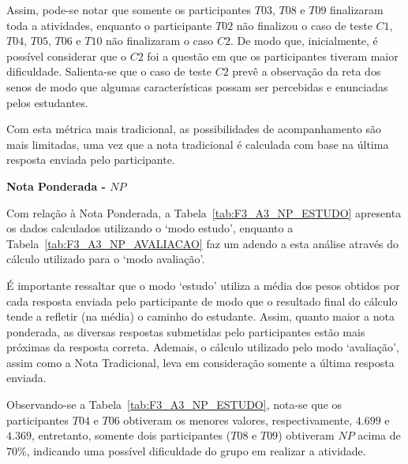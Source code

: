 Assim, pode-se notar que somente os participantes $T03$, $T08$ e $T09$ finalizaram toda a atividades, enquanto o participante $T02$ não finalizou o caso de teste $C1$, $T04$, $T05$, $T06$ e $T10$ não finalizaram o caso $C2$. De modo que, inicialmente, é possível considerar que o $C2$ foi a questão em que os participantes tiveram maior dificuldade. Salienta-se que o caso de teste $C2$ prevê a observação da reta dos senos de modo que algumas características possam ser percebidas e enunciadas pelos estudantes. 

Com esta métrica mais tradicional, as possibilidades de acompanhamento são mais limitadas, uma vez que a nota tradicional é calculada com base na última resposta enviada pelo participante.

\textbf{Nota Ponderada - $NP$}

Com relação à Nota Ponderada, a Tabela~\ref{tab:F3_A3_NP_ESTUDO} apresenta os dados calculados utilizando o `modo estudo', enquanto a Tabela~\ref{tab:F3_A3_NP_AVALIACAO} faz um adendo a esta análise através do cálculo utilizado para o `modo avaliação'. 

É importante ressaltar que o modo `estudo' utiliza a média dos pesos obtidos por cada resposta enviada pelo participante de modo que o resultado final do cálculo tende a refletir (na média) o caminho do estudante. Assim, quanto maior a nota ponderada, as diversas respostas submetidas pelo participantes estão mais próximas da resposta correta. Ademais, o cálculo utilizado pelo modo `avaliação', assim como a Nota Tradicional, leva em consideração somente a última resposta enviada.

Observando-se a Tabela~\ref{tab:F3_A3_NP_ESTUDO}, nota-se que os participantes $T04$ e $T06$ obtiveram os menores valores, respectivamente, $4.699$ e $4.369$, entretanto, somente dois participantes ($T08$ e $T09$) obtiveram $NP$ acima de $70\%$, indicando uma possível dificuldade do grupo em realizar a atividade.


